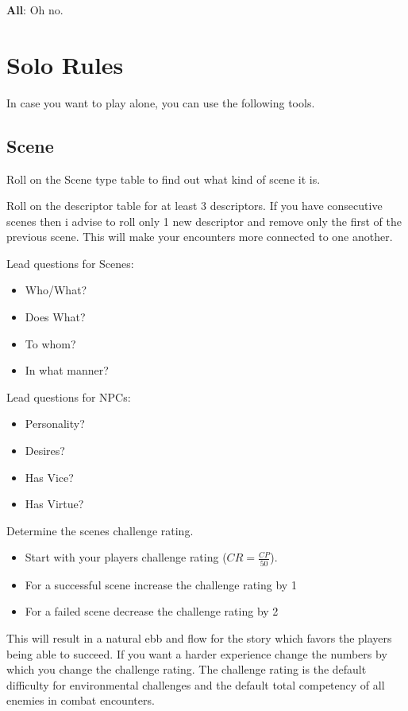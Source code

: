 \documentclass[11pt]{article}
\begin{document}
{\textbf{All}: Oh no.


\newpage
\section{Solo Rules}
\label{sec:org0eddc47}
In case you want to play alone, you can use the following tools.
\subsection{Scene}
\label{sec:org9624553}
Roll on the Scene type table to find out what kind of scene it is.

Roll on the descriptor table for at least 3 descriptors. If you have consecutive scenes then i advise to roll only 1 new descriptor and remove only the first of the previous scene. This will make your encounters more connected to one another.

\begin{multicols}{2}
Lead questions for Scenes: 
\begin{itemize}
\item Who/What?
\item Does What?
\item To whom?
\item In what manner?
\end{itemize}
\columnbreak
Lead questions for NPCs:
\begin{itemize}
\item Personality?
\item Desires?
\item Has Vice?
\item Has Virtue?
\end{itemize}
\end{multicols}

Determine the scenes challenge rating.
\begin{itemize}
\item Start with your players challenge rating (\(CR = \frac{CP}{50}\)).
\item For a successful scene increase the challenge rating by 1
\item For a failed scene decrease the challenge rating by 2
\end{itemize}

This will result in a natural ebb and flow for the story which favors the players being able to succeed. If you want a harder experience change the numbers by which you change the challenge rating. 
The challenge rating is the default difficulty for environmental challenges and the default total competency of all enemies in combat encounters.

}
\end{document}
